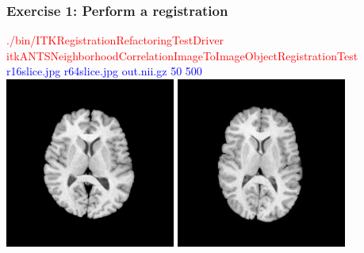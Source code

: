 

\begin{frame}
\frametitle{Exercise 1: Perform a registration}
\textcolor{red}{./bin/ITKRegistrationRefactoringTestDriver itkANTSNeighborhoodCorrelationImageToImageObjectRegistrationTest}\\
\textcolor{blue}{r16slice.jpg r64slice.jpg out.nii.gz  50 500 }\\
\includegraphics[height=2.2in]{../Art/r16slice.jpg}
\includegraphics[height=2.2in]{../Art/r64slice.jpg}
\end{frame}

